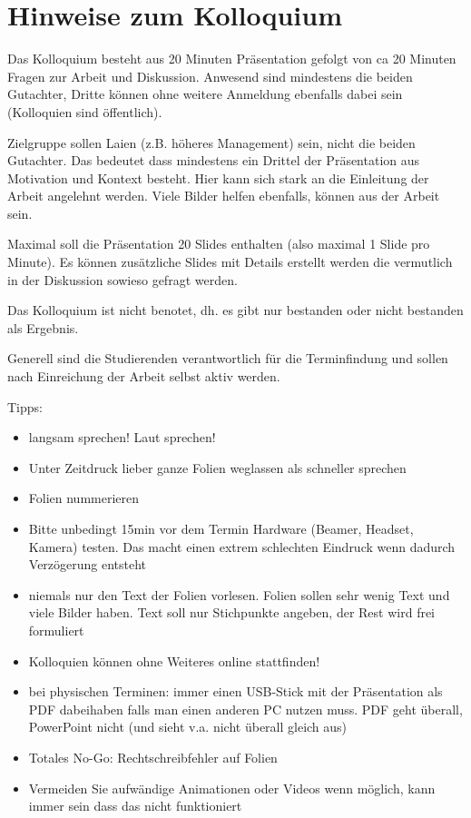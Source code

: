 \documentclass[12pt,oneside]{article}
\begin{document}
\section{Hinweise zum Kolloquium}
Das Kolloquium besteht aus 20 Minuten Präsentation gefolgt von ca 20 Minuten Fragen zur Arbeit und Diskussion. Anwesend sind mindestens die beiden Gutachter, Dritte können ohne weitere Anmeldung ebenfalls dabei sein (Kolloquien sind öffentlich). 

Zielgruppe sollen Laien (z.B. höheres Management) sein, nicht die beiden Gutachter. Das bedeutet dass mindestens ein Drittel der Präsentation aus Motivation und Kontext besteht. Hier kann sich stark an die Einleitung der Arbeit angelehnt werden. Viele Bilder helfen ebenfalls, können aus der Arbeit sein.

Maximal soll die Präsentation 20 Slides enthalten (also maximal 1 Slide pro Minute). Es können zusätzliche Slides mit Details erstellt werden die vermutlich in der Diskussion sowieso gefragt werden.

Das Kolloquium ist nicht benotet, dh. es gibt nur bestanden oder nicht bestanden als Ergebnis. 

Generell sind die Studierenden verantwortlich für die Terminfindung und sollen nach Einreichung der Arbeit selbst aktiv werden. 

Tipps:
\begin{itemize}
    \item langsam sprechen! Laut sprechen!
    \item Unter Zeitdruck lieber ganze Folien weglassen als schneller sprechen
    \item Folien nummerieren
    \item Bitte unbedingt 15min vor dem Termin Hardware (Beamer, Headset, Kamera) testen. Das macht einen extrem schlechten Eindruck wenn dadurch Verzögerung entsteht
    \item niemals nur den Text der Folien vorlesen. Folien sollen sehr wenig Text und viele Bilder haben. Text soll nur Stichpunkte angeben, der Rest wird frei formuliert
    \item Kolloquien können ohne Weiteres online stattfinden!
    \item bei physischen Terminen: immer einen USB-Stick mit der Präsentation als PDF dabeihaben falls man einen anderen PC nutzen muss. PDF geht überall, PowerPoint nicht (und sieht v.a. nicht überall gleich aus)
    \item Totales No-Go: Rechtschreibfehler auf Folien
    \item Vermeiden Sie aufwändige Animationen oder Videos wenn möglich, kann immer sein dass das nicht funktioniert
\end{itemize}


\end{document}
